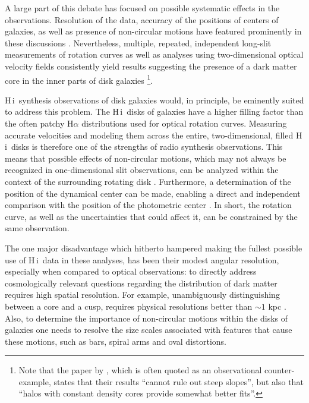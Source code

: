 \documentclass[usenatbib,usegraphicx,apjfonts,floatfix]{emulateapj}
\newcommand{\HI}{H\,{\sc i}}
\begin{document}
A large part of this debate has focused on possible
systematic effects in the observations. Resolution of the data, 
accuracy of the positions of centers of galaxies, as well as presence
of non-circular motions have featured prominently in these discussions
\citep[e.g.,][]{swaters_phd,frankvdb,SMT,simon2003,rhee2004}.
Nevertheless, multiple, repeated, independent long-slit measurements
of rotation curves as well as analyses using two-dimensional optical
velocity fields consistently yield results suggesting the presence of
a dark matter core in the inner parts of disk galaxies
\citep[e.g.,][]{mar2002,
  edb_sydney,dBB2002,rachel,gentile2007,spano}\footnote{Note that the paper
  by \citet{swaters03}, which is often quoted as an observational
  counter-example, states that their results ``cannot rule out steep
  slopes'', but also that ``halos with constant density cores provide somewhat
  better fits''.}.

\HI\ synthesis observations of disk galaxies would, in principle, be
eminently suited to address this problem. The \HI\ disks of galaxies
have a higher filling factor than the often patchy H$\alpha$
distributions used for optical rotation curves. Measuring accurate
velocities and modeling them across the entire, two-dimensional,
filled \HI\ disks is therefore one of the strengths of radio
synthesis observations. This means that possible effects of
non-circular motions, which may not always be recognized in one-dimensional
slit observations, can be analyzed within the context of the
surrounding rotating disk \citep{oh2007,clemens2007}.  Furthermore, a  determination
of the position of the dynamical center can be made, enabling a direct and independent
comparison with the position of the photometric center \citep{clemens2007}. In short, the rotation curve,
as well as the uncertainties that could affect it, can be constrained
by the same observation.

The one major disadvantage which hitherto hampered making
the fullest possible use of \HI\ data in these analyses, has been
their modest angular resolution, especially when compared to optical
observations: to directly address cosmologically relevant questions
regarding the distribution of dark matter requires high spatial
resolution.  For example, unambiguously distinguishing between a core
and a cusp, requires physical resolutions better than $\sim 1$ kpc
\citep{edb_sydney}.  Also, to determine the importance of non-circular
motions within the disks of galaxies one needs to resolve the size
scales associated with features that cause these motions, such as
bars, spiral arms and oval distortions.
\end{document}
